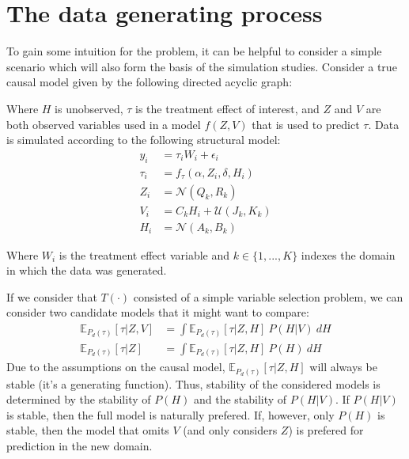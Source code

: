 \documentclass[a4paper,12pt]{article}
\theoremstyle{proposition}
\begin{document}
\section{ The data generating process }

To gain some intuition for the problem, it can be helpful to consider a simple scenario which will also form the basis of the simulation studies. Consider a true causal model given by the following directed acyclic graph:

\vspace{5mm}
\vspace{5mm}

\noindent Where $H$ is unobserved, $\tau$ is the treatment effect of interest, and $Z$ and $V$ are both observed variables used in a model $f(Z, V)$ that is used to predict $\tau$.
%
Data is simulated according to the following structural model:
%
\begin{align*}
y_i &= \tau_i W_i + \epsilon_i \\
\tau_i &= f_{\tau}(\alpha, Z_i, \delta,  H_i) \\
Z_i &= \mathcal{N}(Q_{k}, R_{k}) \\
V_i &= C_k H_i + \mathcal{U}(J_{k}, K_{k}) \\
H_i &= \mathcal{N}(A_{k}, B_{k})
\end{align*}

Where $W_i$ is the treatment effect variable and $k \in \{1,...,K\}$ indexes the domain in which the data was generated.

If we consider that $T(\cdot)$ consisted of a simple variable selection problem, we can consider two candidate models that it might want to compare:
%
\begin{align*}
\mathbb{E}_{P_d(\tau)}[\tau | Z, V] &= \int \mathbb{E}_{P_d(\tau)}[\tau | Z, H] \ P(H | V) \ dH \\
\mathbb{E}_{P_d(\tau)}[\tau | Z] &= \int \mathbb{E}_{P_d(\tau)}[\tau | Z, H] \ P(H) \ dH
\end{align*}
%
Due to the assumptions on the causal model, $\mathbb{E}_{P_d(\tau)}[\tau | Z, H]$ will always be stable (it's a generating function). Thus, stability of the considered models is determined by the stability of $P(H)$ and the stability of $P(H | V)$. If $P(H | V)$ is stable, then the full model is naturally prefered. If, however, only $P(H)$ is stable, then the model that omits $V$ (and only considers $Z$) is prefered for prediction in the new domain.
\end{document}
